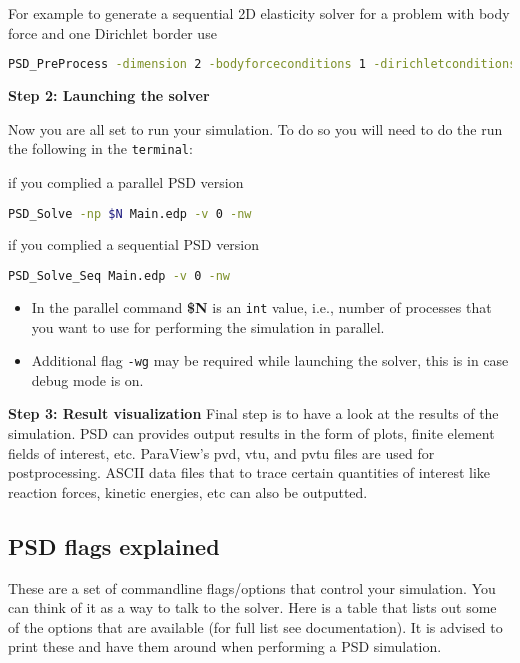 For example to generate a sequential 2D elasticity solver for a problem
with body force and one Dirichlet border use

\begin{lstlisting}[language=bash]
PSD_PreProcess -dimension 2 -bodyforceconditions 1 -dirichletconditions 1
\end{lstlisting}

\textbf{Step 2: Launching the solver}

Now you are all set to run your simulation. To do so you will need to do
the run the following in the \lstinline!terminal!:

if you complied a parallel PSD version

\begin{lstlisting}[language=bash]
PSD_Solve -np $N Main.edp -v 0 -nw
\end{lstlisting}

if you complied a sequential PSD version

\begin{lstlisting}[language=bash]
PSD_Solve_Seq Main.edp -v 0 -nw
\end{lstlisting}

\begin{itemize}
\item
  In the parallel command \textbf{\$N} is an \lstinline!int! value,
  i.e., number of processes that you want to use for performing the
  simulation in parallel.
\item
  Additional flag \lstinline!-wg! may be required while launching the
  solver, this is in case debug mode is on.
\end{itemize}

\textbf{Step 3: Result visualization} Final step is to have a look at
the results of the simulation. PSD can provides output results in the
form of plots, finite element fields of interest, etc. ParaView's pvd,
vtu, and pvtu files are used for postprocessing. ASCII data files that
to trace certain quantities of interest like reaction forces, kinetic
energies, etc can also be outputted.

\subsection{PSD flags explained}\label{psd-flags-explained}

These are a set of commandline flags/options that control your
simulation. You can think of it as a way to talk to the solver. Here is
a table that lists out some of the options that are available (for full
list see documentation). It is advised to print these and have them
around when performing a PSD simulation.


